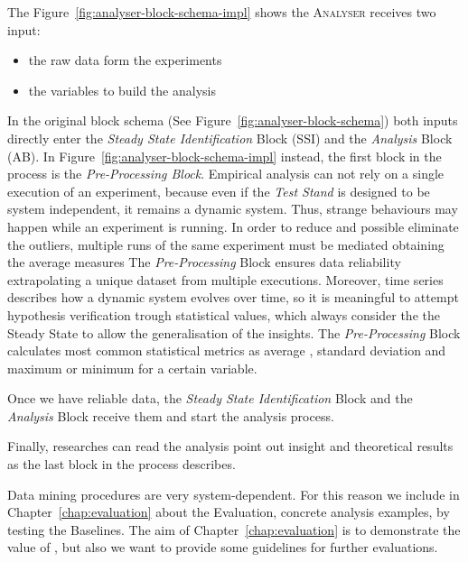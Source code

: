 The Figure~\ref{fig:analyser-block-schema-impl} shows the \textsc{Analyser} receives two input:
\begin{itemize}
\item the raw data form the experiments
\item the variables to build the analysis
\end{itemize}


In the original block schema (See Figure~\ref{fig:analyser-block-schema}) both inputs directly enter the \textit{Steady State Identification} Block (SSI) and the \textit{Analysis} Block (AB). In Figure~\ref{fig:analyser-block-schema-impl}   instead, the first block in the process is the \textit{Pre-Processing Block}. Empirical analysis can not rely on a single execution of an experiment, because even if the \textit{Test Stand} is designed to be system independent, it remains a dynamic system. Thus, strange behaviours may happen while an experiment is running. In order to reduce and possible eliminate the outliers, multiple runs of the same experiment must be mediated obtaining the average measures The \textit{Pre-Processing} Block ensures data reliability extrapolating a unique dataset from multiple executions. Moreover, time series describes how a dynamic system evolves over time, so it is meaningful to attempt hypothesis verification trough statistical values, which always consider the the Steady State to allow the generalisation of the insights. The \textit{Pre-Processing} Block calculates most common statistical metrics as average , standard deviation and maximum or minimum for a certain variable.


Once we have reliable data, the \textit{Steady State Identification} Block and the \textit{Analysis} Block receive them and start the analysis process. 

Finally, researches can read the analysis point out insight and theoretical results as the last block in the process describes.

Data mining procedures are very system-dependent. For this reason we include in Chapter~\ref{chap:evaluation} about the \name Evaluation, concrete analysis examples, by testing the Baselines. The aim of Chapter~\ref{chap:evaluation} is to demonstrate the value of \namens, but also we want to provide some guidelines for further evaluations.

